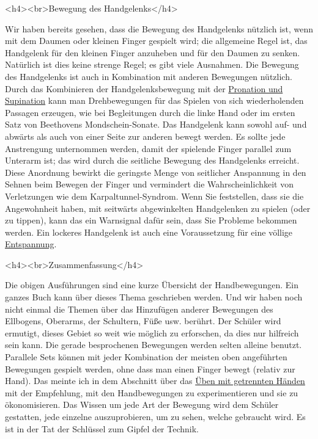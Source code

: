 <h4><br>Bewegung des Handgelenks</h4>

Wir haben bereits gesehen, dass die Bewegung des Handgelenks nützlich ist, wenn mit dem Daumen oder kleinen Finger gespielt wird; die allgemeine Regel ist, das Handgelenk für den kleinen Finger anzuheben und für den Daumen zu senken.
Natürlich ist dies keine strenge Regel; es gibt viele Ausnahmen.
Die Bewegung des Handgelenks ist auch in Kombination mit anderen Bewegungen nützlich.
Durch das Kombinieren der Handgelenksbewegung mit der \hyperlink{c1iii4ProSup}{Pronation und Supination} kann man Drehbewegungen für das Spielen von sich wiederholenden Passagen erzeugen, wie bei Begleitungen durch die linke Hand oder im ersten Satz von Beethovens Mondschein-Sonate.
Das Handgelenk kann sowohl auf- und abwärts als auch von einer Seite zur anderen bewegt werden.
Es sollte jede Anstrengung unternommen werden, damit der spielende Finger parallel zum Unterarm ist; das wird durch die seitliche Bewegung des Handgelenks erreicht.
Diese Anordnung bewirkt die geringste Menge von seitlicher Anspannung in den Sehnen beim Bewegen der Finger und vermindert die Wahrscheinlichkeit von Verletzungen wie dem Karpaltunnel-Syndrom.
Wenn Sie feststellen, dass sie die Angewohnheit haben, mit seitwärts abgewinkelten Handgelenken zu spielen (oder zu tippen), kann das ein Warnsignal dafür sein, dass Sie Probleme bekommen werden.
Ein lockeres Handgelenk ist auch eine Voraussetzung für eine völlige \hyperlink{c1ii14}{Entspannung}.


<h4><br>Zusammenfassung</h4>

Die obigen Ausführungen sind eine kurze Übersicht der Handbewegungen.
Ein ganzes Buch kann über dieses Thema geschrieben werden.
Und wir haben noch nicht einmal die Themen über das Hinzufügen anderer Bewegungen des Ellbogens, Oberarms, der Schultern, Füße usw. berührt.
Der Schüler wird ermutigt, dieses Gebiet so weit wie möglich zu erforschen, da dies nur hilfreich sein kann.
Die gerade besprochenen Bewegungen werden selten alleine benutzt.
Parallele Sets können mit jeder Kombination der meisten oben angeführten Bewegungen gespielt werden, ohne dass man einen Finger bewegt (relativ zur Hand).
Das meinte ich in dem Abschnitt über das \hyperlink{c1ii7}{Üben mit getrennten Händen} mit der Empfehlung, mit den Handbewegungen zu experimentieren und sie zu ökonomisieren.
Das Wissen um jede Art der Bewegung wird dem Schüler gestatten, jede einzelne auszuprobieren, um zu sehen, welche gebraucht wird.
Es ist in der Tat der Schlüssel zum Gipfel der Technik.



